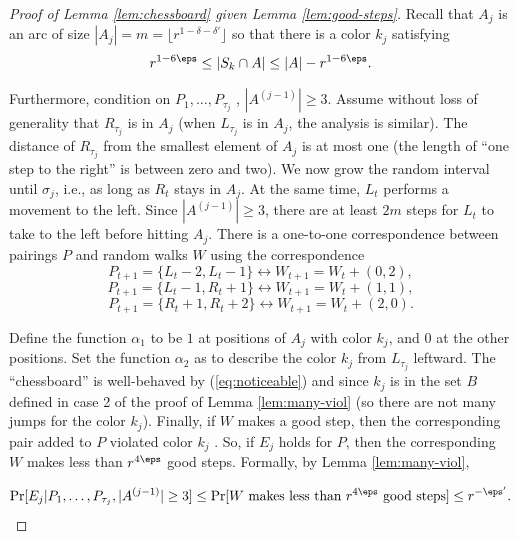 \documentclass{article}
\begin{document}
\begin{proof}[Proof of Lemma \ref{lem:chessboard} given Lemma \ref{lem:good-steps}]
    Recall that $A_j$ is an arc of size $|A_j| = m = \lfloor r^{1-\delta - \delta'}\rfloor$
 so that there is a color
$k_j$ satisfying
\begin{equation}\label{eq:noticeable}
r^{1-6\eps} \leq |S_{k}\cap A| \leq 
|A| - r^{1-6\eps}.
\end{equation}

Furthermore, condition on $P_1, \ldots, P_{\tau_j}$
, $|A^{(j-1)}| \geq 3$. Assume without loss of generality that $R_{\tau_j}$
is in $A_j$ (when $L_{\tau_j}$
is
in $A_j$, the analysis is similar). The distance of $R_{\tau_j}$
from the smallest element of $A_j$ is at most one
(the length of “one step to the right” is between zero and two). We now grow the random interval
until $\sigma_j$, i.e., as long as $R_t$ stays in $A_j$. At the same time, $L_t$ performs a movement to the left.
Since $|A^{(j-1)}| \geq 3$, there are at least $2m$ steps for $L_t$ to take to the left before hitting $A_j$.
There is a one-to-one correspondence between pairings $P$ and random walks $W$ using the correspondence
\[
P_{t+1} = \{L_t - 2, L_t - 1\} \longleftrightarrow W_{t+1} = W_t + (0, 2),
\]
\[
P_{t+1} = \{L_t - 1, R_t + 1\} \longleftrightarrow W_{t+1} = W_t + (1, 1), \]
\[
P_{t+1} = \{R_t + 1, R_t + 2\} \longleftrightarrow W_{t+1} = W_t + (2, 0).
\]

Define the function $\alpha_1$ to be $1$ at positions of $A_j$ with color $k_j$, and $0$ at the other positions. Set
the function $\alpha_2$ as to describe the color $k_j$ from $L_{\tau_j}$
leftward. The “chessboard” is well-behaved by
(\ref{eq:noticeable}) and since $k_j$ is in the set $B$ defined in case 2 of the proof of Lemma \ref{lem:many-viol} (so there are not many
jumps for the color $k_j$).
Finally, if $W$ makes a good step, then the corresponding pair added to $P$ violated color $k_j$ .
So, if $E_j$ holds for $P$, then the corresponding $W$ makes less than $r^{4\eps}$ good steps. Formally, by
Lemma \ref{lem:many-viol},

\[
\Pr[E_j|P_1,\ldots, P_{\tau_j}, |A^{(j-1)}| \geq 3]\leq \Pr[\text{$W$ makes less than $r^{4\eps}$ good steps}] \leq r^{-\eps'}.
\]
\end{proof}
\end{document}
